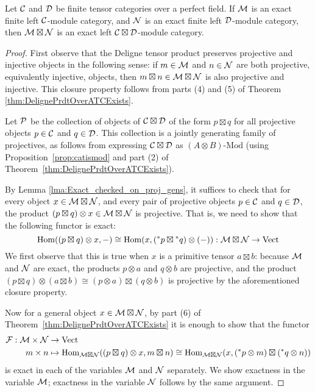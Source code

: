 \documentclass{amsart}
\begin{document}
\begin{theorem}\label{thm:tensor-exactness}
Let $\mathcal C$ and $\mathcal D$ be finite tensor categories over a perfect field.  If $\mathcal M$ is an exact finite left $\mathcal C$-module category, and $\mathcal N$ is an exact finite left $\mathcal D$-module category, then $\mathcal M \boxtimes \mathcal N$ is an exact left $\mathcal C \boxtimes \mathcal D$-module category.
\end{theorem}


\begin{proof} 
First observe that the Deligne tensor product preserves projective and injective objects in the following sense: if $m \in \mathcal M$ and $n \in \mathcal N$ are both projective, equivalently injective, objects, then $m \boxtimes n \in \mathcal M \boxtimes \mathcal N$ is also projective and injective.  This closure property follows from parts (4) and (5) of Theorem \ref{thm:DelignePrdtOverATCExists}.

Let $\mathcal P$ be the collection of objects of $\mathcal C \boxtimes \mathcal D$ of the form $p \boxtimes q$ for all projective objects $p \in \mathcal C$ and $q \in \mathcal D$.  This collection is a jointly generating family of projectives, as follows from expressing $\mathcal C \boxtimes \mathcal D$ as $(A \otimes B)\textrm{-}\mathrm{Mod}$ (using Proposition~\ref{prop:catismod} and part (2) of Theorem~\ref{thm:DelignePrdtOverATCExists}).

By Lemma \ref{lma:Exact_checked_on_proj_gens}, it suffices to check that for every object $x \in \mathcal M \boxtimes \mathcal N$, and every pair of projective objects $p \in \mathcal C$ and $q \in \mathcal D$, the product $(p \boxtimes q) \otimes x \in \mathcal M \boxtimes \mathcal N$ is projective.  That is, we need to show that the following functor is exact:
\begin{equation*}
	\operatorname{Hom}((p \boxtimes q) \otimes x, -) \cong \operatorname{Hom}(x, ({}^*p \boxtimes {}^*q) \otimes(-) ): \mathcal M \boxtimes \mathcal N \to \mathrm{Vect}
\end{equation*}
We first observe that this is true when $x$ is a primitive tensor $a \boxtimes b$: because $\mathcal M$ and $\mathcal N$ are exact, the products $p \otimes a$ and $q \otimes b$ are projective, and the product $(p \boxtimes q) \otimes (a \boxtimes b) \cong (p \otimes a) \boxtimes (q \otimes b)$ is projective by the aforementioned closure property.

Now for a general object $x \in \mathcal M \boxtimes \mathcal N$, by part (6) of Theorem~\ref{thm:DelignePrdtOverATCExists} it is enough to show that the functor
\begin{align*}
\mathcal F: \mathcal M \times \mathcal N &\rightarrow \mathrm{Vect} \\
m \times n &\mapsto \operatorname{Hom}_{\mathcal M \boxtimes \mathcal N}((p \boxtimes q) \otimes x, m \boxtimes n) \cong \operatorname{Hom}_{\mathcal M \boxtimes \mathcal N}(x, ({}^* p \otimes m) \boxtimes ({}^* q \otimes n))
\end{align*}
is exact in each of the variables $\mathcal M$ and $\mathcal N$ separately.  We show exactness in the variable $\mathcal M$; exactness in the variable $\mathcal N$ follows by the same argument.


\end{proof}
\end{document}
